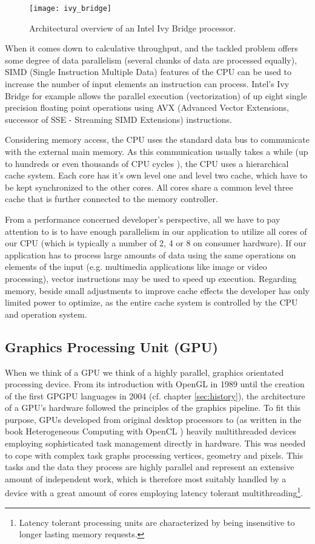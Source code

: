 \begin{figure}
\centering
\texttt{[image: ivy\_bridge]}
\caption{Architectural overview of an Intel Ivy Bridge processor. \cite{ivy_bridge}}
\label{fig:ivy_bridge}
\end{figure}

When it comes down to calculative throughput, and the tackled problem offers some degree of data parallelism (several chunks of data are processed equally), SIMD (Single Instruction Multiple Data) features of the CPU can be used to increase the number of input elements an instruction can process. Intel's Ivy Bridge for example allows the parallel execution (vectorization) of up eight single precision floating point operations using AVX (Advanced Vector Extensions, successor of SSE - Streaming SIMD Extensions) instructions.

Considering memory access, the CPU uses the standard data bus to communicate with the external main memory. As this communication usually takes a while (up to hundreds or even thousands of CPU cycles \cite[p.54]{opencl_book}), the CPU uses a hierarchical cache system. Each core has it's own level one and level two cache, which have to be kept synchronized to the other cores. All cores share a common level three cache that is further connected to the memory controller.

From a performance concerned developer's perspective, all we have to pay attention to is to have enough parallelism in our application to utilize all cores of our CPU (which is typically a number of 2, 4 or 8 on consumer hardware). If our application has to process large amounts of data using the same operations on elements of the input (e.g. multimedia applications like image or video processing), vector instructions may be used to speed up execution. Regarding memory, beside small adjustments to improve cache effects the developer has only limited power to optimize, as the entire cache system is controlled by the CPU and operation system. 


\subsection{Graphics Processing Unit (GPU)}
\label{sec:gpu}

When we think of a GPU we think of a highly parallel, graphics orientated processing device. From its introduction with OpenGL in 1989 until the creation of the first GPGPU languages in 2004 (cf. chapter \ref{sec:history}), the architecture of a GPU's hardware followed the principles of the graphics pipeline. To fit this purpose, GPUs developed from original desktop processors to (as written in the book Heterogeneous Computing with OpenCL \cite{opencl_book}) heavily multithreaded devices employing sophisticated task management directly in hardware. This was needed to cope with complex task graphs processing vertices, geometry and pixels. This tasks and the data they process are highly parallel and represent an extensive amount of independent work, which is therefore most suitably handled by a device with a great amount of cores employing latency tolerant multithreading\footnote{Latency tolerant processing units are characterized by being insensitive to longer lasting memory requests.}.

